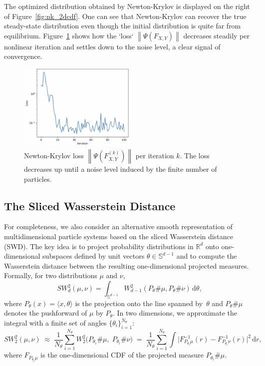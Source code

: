 \documentclass{article}
\newcommand{\norm}[1]{\left\lVert#1\right\rVert}
\begin{document}
The optimized distribution obtained by Newton-Krylov is displayed on the right of Figure~\ref{fig:nk_2dcdf}. One can see that Newton-Krylov can recover the true steady-state distribution even though the initial distribution is quite far from equilibrium. Figure~\ref{fig:nk_2dcdf_loss} shows how the `loss` $\norm{\Psi\left(F_{X,Y}\right)}$ decreases steadily per nonlinear iteration and settles down to the noise level, a clear signal of convergence.

\begin{figure}[h]
    \centering
    \includegraphics[width=0.5\textwidth]{figures/CDF2DHalfMoonLoss.png}
    \caption{Newton-Krylov loss $\norm{\Psi\left(F^{(k)}_{X,Y}\right)}$ per iteration $k$. The loss decreases up until a noise level induced by the finite number of particles.}
    \label{fig:nk_2dcdf_loss}
\end{figure}

\subsection{The Sliced Wasserstein Distance} \label{subsec:sw2}
For completeness, we also consider an alternative smooth representation of multidimensional particle systems based on the sliced Wasserstein distance (SWD). The key idea is to project probability distributions in $\mathbb{R}^d$ onto one-dimensional subspaces defined by unit vectors $\theta \in \mathbb{S}^{d-1}$ and to compute the Wasserstein distance between the resulting one-dimensional projected measures. Formally, for two distributions $\mu$ and $\nu$,
\begin{equation}
  SW_d^2(\mu,\nu) = \int_{\mathbb{S}^{d-1}}
  W_{d-1}^2\left(P_\theta \# \mu, P_\theta \# \nu\right)\,\mathrm{d}\theta,
\end{equation}
where $P_\theta(x)=\langle x,\theta\rangle$ is the projection onto the line spanned by~$\theta$ and $P_\theta \# \mu$ denotes the pushforward of $\mu$ by $P_\theta$.
In two dimensions, we approximate the integral with a finite set of angles $\{\theta_i\}_{i=1}^{N_\theta}$:
\begin{equation}
  SW_2^2(\mu,\nu)
  \;\approx\;
  \frac{1}{N_\theta}\sum_{i=1}^{N_\theta}
  W_2^2\!\big(P_{\theta_i}\#\mu,\; P_{\theta_i}\#\nu\big)
  \;=\;
  \frac{1}{N_\theta}\sum_{i=1}^{N_\theta}
  \int \!\big|F_{P_{\theta_i}\mu}^{-1}(r)-F_{P_{\theta_i}\nu}^{-1}(r)\big|^2\,\mathrm{d}r,
\end{equation}
where $F_{P_{\theta_i}\mu}$ is the one-dimensional CDF of the projected measure $P_{\theta_i}\#\mu$.
\end{document}
